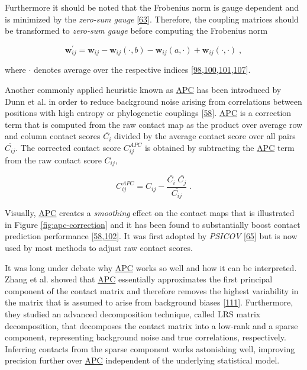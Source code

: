 \documentclass[11pt,a4paper,twoside]{book}
\newcommand{\w}{\mathbf{w}}
\newcommand{\wij}{\mathbf{w}_{ij}}
\theoremstyle{definition}
\theoremstyle{definition}
\theoremstyle{remark}
\begin{document}
Furthermore it should be noted that the Frobenius norm is gauge
dependent and is minimized by the \emph{zero-sum gauge}
{[}\protect\hyperlink{ref-Weigt2009}{63}{]}. Therefore, the coupling
matrices should be transformed to \emph{zero-sum gauge} before computing
the Frobenius norm

\begin{equation}
    \w^{\prime}_{ij}  = \wij - \wij(\cdot, b) - \wij(a, \cdot) + \wij(\cdot, \cdot) \; ,
\label{eq:zero-sum-gauge-transform}
\end{equation}

where \(\cdot\) denotes average over the respective indices
{[}\protect\hyperlink{ref-Ekeberg2013}{98},\protect\hyperlink{ref-Seemayer2014}{100},\protect\hyperlink{ref-Ekeberg2014}{101},\protect\hyperlink{ref-Baldassi2014}{107}{]}.

Another commonly applied heuristic known as
\protect\hyperlink{abbrev}{APC} has been introduced by Dunn et al. in
order to reduce background noise arising from correlations between
positions with high entropy or phylogenetic couplings
{[}\protect\hyperlink{ref-Dunn2008}{58}{]}.
\protect\hyperlink{abbrev}{APC} is a correction term that is computed
from the raw contact map as the product over average row and column
contact scores \(\overline{C_i}\) divided by the average contact score
over all pairs \(\overline{C_{ij}}\). The corrected contact score
\(C_{ij}^{APC}\) is obtained by subtracting the
\protect\hyperlink{abbrev}{APC} term from the raw contact score
\(C_{ij}\),

\begin{equation}
    C_{ij}^{APC}  = C_{ij} - \frac{\overline{C_i} \; \overline{C_j}}{\overline{C_{ij}}}\; .
\label{eq:apc}
\end{equation}

Visually, \protect\hyperlink{abbrev}{APC} creates a \emph{smoothing}
effect on the contact maps that is illustrated in Figure
\ref{fig:apc-correction} and it has been found to substantially boost
contact prediction performance
{[}\protect\hyperlink{ref-Dunn2008}{58},\protect\hyperlink{ref-Kamisetty2013}{102}{]}.
It was first adopted by \emph{PSICOV}
{[}\protect\hyperlink{ref-Jones2012}{65}{]} but is now used by most
methods to adjust raw contact scores.

It was long under debate why \protect\hyperlink{abbrev}{APC} works so
well and how it can be interpreted. Zhang et al. showed that
\protect\hyperlink{abbrev}{APC} essentially approximates the first
principal component of the contact matrix and therefore removes the
highest variability in the matrix that is assumed to arise from
background biases {[}\protect\hyperlink{ref-Zhang2016}{111}{]}.
Furthermore, they studied an advanced decomposition technique, called
LRS matrix decomposition, that decomposes the contact matrix into a
low-rank and a sparse component, representing background noise and true
correlations, respectively.\\
Inferring contacts from the sparse component works astonishing well,
improving precision further over \protect\hyperlink{abbrev}{APC}
independent of the underlying statistical model.
\end{document}
